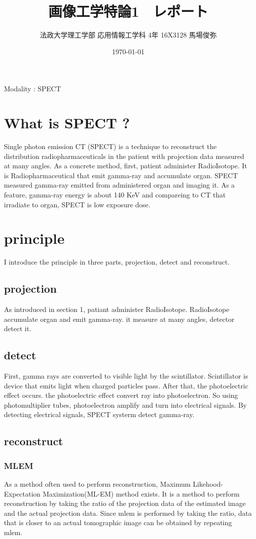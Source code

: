 \documentclass[dvipdfmx,autodetect-engine]{jsarticle}%
\title{画像工学特論1　レポート}
\author{法政大学理工学部 応用情報工学科 4年 16X3128 馬場俊弥}
\date{\today}
\begin{document}
\maketitle
Modality : SPECT
\section{What is SPECT ?}

Single photon emission CT (SPECT) is a technique to reconstruct the distribution radiopharmaceuticals in the patient with projection data measured at many angles. As a concrete method, first, patient administer RadioIsotope. It is Radiopharmaceutical that emit gamma-ray and accumulate organ. SPECT measured gamma-ray emitted from administered organ and imaging it. As a feature, gamma-ray energy is about 140 KeV and compareing to CT that irradiate to organ, SPECT is low exposure dose.

\section{principle}
I introduce the principle in three parts, projection, detect and reconstruct.
\subsection{projection}
As introduced in section 1, patiant administer RadioIsotope. RadioIsotope accumulate organ and emit gamma-ray. it measure at many angles, detector detect it.
\subsection{detect}
First, gamma rays are converted to visible light by the scintillator. Scintillator is device that emits light when charged particles pass. After that, the photoelectric effect occurs. the photoelectric effect convert ray into photoelectron. So using photomultiplier tubes, photoelectron amplify and turn into electrical signals. By detecting electrical signals, SPECT systerm detect gamma-ray.

\subsection{reconstruct}
\subsubsection{MLEM}
As a method often used to perform reconstruction, Maximum Likehood-Expectation Maximization(ML-EM) method exists. It is a method to perform reconstruction by taking the ratio of the projection data of the estimated image and the actual projection data. Since mlem is performed by taking the ratio, data that is closer to an actual tomographic image can be obtained by repeating mlem.
\end{document}
